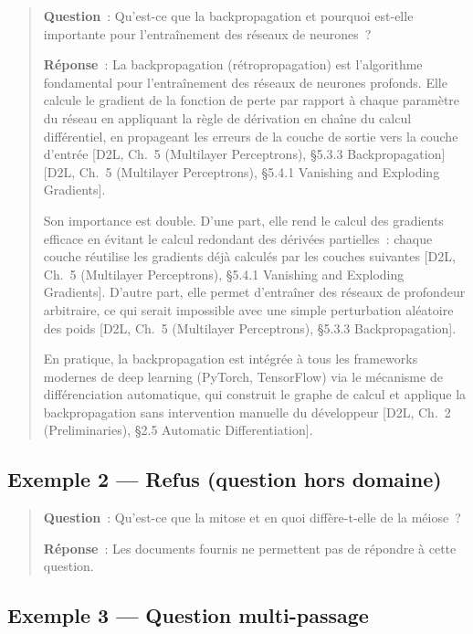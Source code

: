 \documentclass[11pt,a4paper]{article}
\begin{document}
\begin{quote}
\textbf{Question}~: Qu'est-ce que la backpropagation et pourquoi est-elle importante pour l'entraînement des réseaux de neurones~?

\textbf{Réponse}~: La backpropagation (rétropropagation) est l'algorithme fondamental pour l'entraînement des réseaux de neurones profonds. Elle calcule le gradient de la fonction de perte par rapport à chaque paramètre du réseau en appliquant la règle de dérivation en chaîne du calcul différentiel, en propageant les erreurs de la couche de sortie vers la couche d'entrée [D2L, Ch.~5 (Multilayer Perceptrons), \S{}5.3.3 Backpropagation][D2L, Ch.~5 (Multilayer Perceptrons), \S{}5.4.1 Vanishing and Exploding Gradients].

Son importance est double. D'une part, elle rend le calcul des gradients efficace en évitant le calcul redondant des dérivées partielles~: chaque couche réutilise les gradients déjà calculés par les couches suivantes [D2L, Ch.~5 (Multilayer Perceptrons), \S{}5.4.1 Vanishing and Exploding Gradients]. D'autre part, elle permet d'entraîner des réseaux de profondeur arbitraire, ce qui serait impossible avec une simple perturbation aléatoire des poids [D2L, Ch.~5 (Multilayer Perceptrons), \S{}5.3.3 Backpropagation].

En pratique, la backpropagation est intégrée à tous les frameworks modernes de deep learning (PyTorch, TensorFlow) via le mécanisme de différenciation automatique, qui construit le graphe de calcul et applique la backpropagation sans intervention manuelle du développeur [D2L, Ch.~2 (Preliminaries), \S{}2.5 Automatic Differentiation].
\end{quote}

\subsection*{Exemple 2 --- Refus (question hors domaine)}

\begin{quote}
\textbf{Question}~: Qu'est-ce que la mitose et en quoi diffère-t-elle de la méiose~?

\textbf{Réponse}~: Les documents fournis ne permettent pas de répondre à cette question.
\end{quote}

\subsection*{Exemple 3 --- Question multi-passage}
\end{document}
